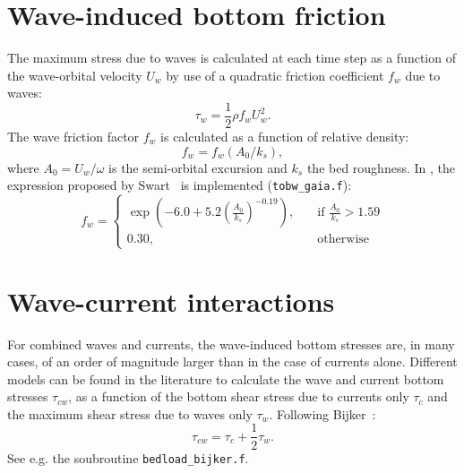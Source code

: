 \section{Wave-induced bottom friction}
The maximum stress due to waves is calculated at each time step as a
function of the wave-orbital velocity $U_w$ by use of a quadratic
friction coefficient $f_w$ due to waves:
\begin{equation*}
  \tau_w = \frac{1}{2}\rho f_w U_w^2.
\end{equation*}
The wave friction factor $f_w$ is calculated as a function of relative
density:
\begin{equation*}
f_w = f_w \left( A_0/k_s \right),
\end{equation*}
where $A_0= U_w/\omega$ is the semi-orbital excursion and $k_s$ the bed roughness.
In \gaia{}, the expression proposed by Swart~\cite{Swart} is implemented (\texttt{tobw\_gaia.f}):
\begin{equation*}
f_w = \left\{\begin{array}{ll}
\exp \left(-6.0 + 5.2\left( \frac{A_0}{k_s} \right)^{-0.19}\right), & \quad \text{if } \frac{A_0}{k_s} > 1.59\\
0.30, & \quad \text{otherwise}
\end{array}
\right.
\end{equation*}

\section{Wave-current interactions}
For combined waves and currents, the wave-induced bottom
stresses are, in many cases, of an order of magnitude larger than in the case of currents
alone. Different models can be found in the literature to calculate the wave
and current bottom stresses $\tau_{cw}$, as a function of the bottom
shear stress due to currents only $\tau_c$ and the maximum shear
stress due to waves only $\tau_w$. Following Bijker~\cite{Bijker}:
\begin{equation}\label{eq:tauBijker}
\tau_{cw} = \tau_c + \frac{1}{2} \tau_w.
\end{equation}
See e.g. the soubroutine \texttt{bedload\_bijker.f}.

